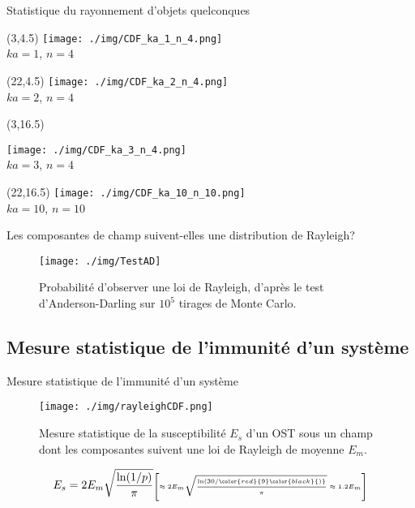 \documentclass[]{beamer}
\begin{document}
\begin{frame}{Statistique du rayonnement d'objets quelconques}
\begin{textblock}{14}(3,4.5)
\centering
\texttt{[image: ./img/CDF\_ka\_1\_n\_4.png]}\\[0.2cm]
\tiny{$ka=1$, $n=4$}
\end{textblock}

\begin{textblock}{14}(22,4.5)
\centering
\texttt{[image: ./img/CDF\_ka\_2\_n\_4.png]}\\[0.2cm]
\tiny{$ka=2$, $n=4$}
\end{textblock}

\begin{textblock}{14}(3,16.5)
\centering

\texttt{[image: ./img/CDF\_ka\_3\_n\_4.png]}\\[0.2cm]
\tiny{$ka=3$, $n=4$}
\end{textblock}

\begin{textblock}{14}(22,16.5)
\centering
\texttt{[image: ./img/CDF\_ka\_10\_n\_10.png]}\\[0.2cm]
\tiny{$ka=10$, $n=10$}
\end{textblock}
\end{frame}

\begin{frame}{Les composantes de champ suivent-elles une distribution de Rayleigh?}
\vspace{-0.3cm}
\begin{figure}
\centering
\texttt{[image: ./img/TestAD]}
\vspace{-0.3cm}
\caption{Probabilité d'observer une loi de Rayleigh, d'après le test d'Anderson-Darling sur $10^5$ tirages de Monte Carlo.}
\end{figure}
\end{frame}


\subsection{Mesure statistique de l'immunité d'un système}
\begin{frame}{Mesure statistique de l'immunité d'un système}
\vspace{-0.7cm}
\begin{figure}
\centering
\texttt{[image: ./img/rayleighCDF.png]}
\vspace{-0.3cm}
\caption{Mesure statistique de la susceptibilité $E_s$ \cite{Amador13} d'un OST sous un champ dont les composantes suivent une loi de Rayleigh de moyenne $E_m$.}
\end{figure}
\begin{equation*}
E_s=2E_m\sqrt{\frac{\ln(1/p)}{\pi}}\text{\tiny{$\left[\approx 2E_m\sqrt{\frac{\ln(30/\color{red}{9}\color{black}{)}}{\pi}}\approx 1.2 E_m\right]$}}
\end{equation*}

\end{frame}
\end{document}
